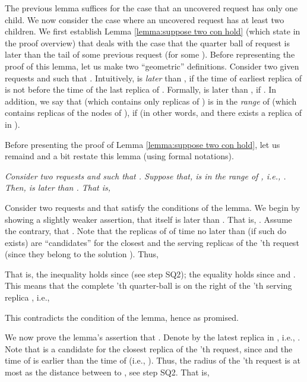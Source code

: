 \documentclass[11pt]{article}
\begin{document}
The previous lemma suffices for the case that an uncovered request has only one child.
We now consider the case where an uncovered request has at least two children.
We first establish Lemma \ref{lemma:suppose two con hold} (which state in the proof overview)
that deals with the case that the quarter ball of request  is later than the tail of some previous request  (for some ).
Before representing the proof of this lemma, let us make two ``geometric'' definitions.
Consider two given requests  and  such that .
Intuitively,  is {\em later} than , if the time of earliest replica of  is not before the time of the last replica of .
Formally,  is later than , if .
In addition, we say that  (which contains only replicas of ) is in the {\em range} of 
(which contains replicas of the nodes of ),
if 
(in other words,  and there exists a replica of  in ).









\newpage

Before presenting the proof of Lemma \ref{lemma:suppose two con hold}, let us remaind and a bit restate this lemma (using formal notations).



{\em
Consider two requests  and  such that .
Suppose that,
 is in the range of , i.e., .
Then,  is later than . That is,

}



Consider two requests  and  that satisfy the conditions of the lemma.
We begin by showing a slightly weaker assertion, that  itself is later than .
That is, .
Assume the contrary, that .
Note that
the replicas of  of time no later than  (if such do exists)
are ``candidates'' for the closest and the serving replicas of the 'th request
(since they belong to the solution ).
Thus,

That is, the inequality holds since  (see step SQ2);
the equality holds since  and .
This means that the complete 'th quarter-ball is on the right of the 'th serving replica , i.e.,

This contradicts the condition of the lemma, hence  as promised.


We now prove the lemma's assertion that .
Denote by  the latest replica in , i.e., .
Note that  is a candidate for the closest replica of the 'th request, since 
and the time of  is earlier than the time of  (i.e., ).
Thus, the radius  of the 'th request is at most as the distance between  to , see step SQ2.
That is,
\end{document}
